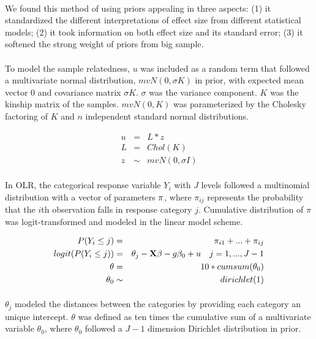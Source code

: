 \documentclass[12pt]{article}
\begin{document}
\paragraph{}{
We found this method of using priors appealing in three aspects: (1) it standardized the different interpretations of effect size from different statistical models; (2) it took information on both effect size and its standard error; (3) it softened the strong weight of priors from big sample.
}

\paragraph{}{
To model the sample relatedness, $u$ was included as a random term that followed a multivariate normal distribution, $mvN(0, \sigma K)$ in prior, with expected mean vector 0 and covariance matrix $\sigma K$. $\sigma$ was the variance component. $K$ was the kinship matrix of the samples. $mvN(0, K)$ was parameterized by the Cholesky factoring of $K$ and $n$ independent standard normal distributions.
}

\begin{eqnarray}
   u & = &  L * z \\
   L & = & Chol(K) \\
   z & \sim & mvN(0, \sigma I)
\end{eqnarray}

\paragraph{}{
In OLR, the categorical response variable $Y_i$ with $J$ levels followed a multinomial distribution with a vector of parameters $\bold{\pi}$, where $\pi_{ij}$ represents the probability that the $i$th observation falls in response category $j$. Cumulative distribution of $\pi$ was logit-transformed and modeled in the linear model scheme.
}

\begin{eqnarray}
  P(Y_i \leq j) & = & \pi_{i1} + ... + \pi_{ij} \\
  logit(P(Y_i \leq j) ) & = & \theta_j - \bold{X} \beta - g \beta_0 + u \quad j = 1,..., J-1 \\
  \theta & = & 10 * cumsum(\theta_0) \\
  \theta_0 & \sim & dirichlet(1)
\end{eqnarray}

\paragraph{}{
${\theta_j}$ modeled the distances between the categories by providing each category an unique intercept. $\theta$ was defined as ten times the cumulative sum of a multivariate variable $\theta_0$, where $\theta_0$ followed a $J-1$ dimension Dirichlet distribution in prior. 
}
\end{document}
